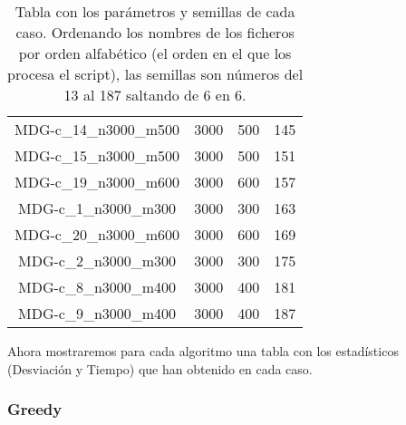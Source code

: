 \documentclass{article}
\begin{document}
\begin{table}[H]
\begin{tabular}{|cccc|}
		MDG-c\_14\_n3000\_m500 & 3000 & 500 & 145\\
		MDG-c\_15\_n3000\_m500 & 3000 & 500 & 151\\
		MDG-c\_19\_n3000\_m600 & 3000 & 600 & 157\\
		MDG-c\_1\_n3000\_m300 & 3000 & 300 & 163\\
		MDG-c\_20\_n3000\_m600 & 3000 & 600 & 169\\
		MDG-c\_2\_n3000\_m300 & 3000 & 300 & 175\\
		MDG-c\_8\_n3000\_m400 & 3000 & 400 & 181\\
		MDG-c\_9\_n3000\_m400 & 3000 & 400 & 187\\
		\hline
	\end{tabular}
	\caption{Tabla con los parámetros y semillas de cada caso. Ordenando los nombres de los ficheros por orden alfabético
		(el orden en el que los procesa el script), las semillas son números del 13 al 187 saltando de 6 en 6.}
	\label{tab:param-seed}
\end{table}

Ahora mostraremos para cada algoritmo una tabla con los estadísticos (Desviación y Tiempo) que han obtenido en cada
caso.

\pagebreak

\subsubsection*{Greedy}
\end{document}
